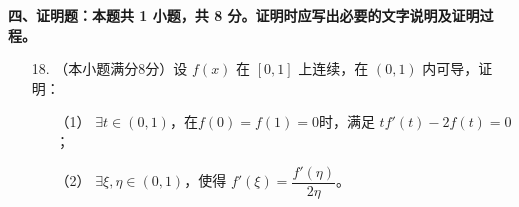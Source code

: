 \documentclass[a4paper,12pt]{article}
\begin{document}
\noindent
\textbf{四、证明题：本题共 1 小题，共 8 分。证明时应写出必要的文字说明及证明过程。}

\begin{enumerate}
    \item[18.]（本小题满分8分）设 \( f(x) \) 在 \( [0, 1] \) 上连续，在 \( (0, 1) \) 内可导，证明：

    \begin{enumerate}
        \item[（1）]\(\exists t \in (0, 1) \)，在\( f(0) = f(1) = 0\)时，满足 \( tf'(t)-2f(t) = 0 \)；
        \item[（2）]\(\exists \xi, \eta \in (0, 1) \)，使得 \( f'(\xi) = \dfrac{f'(\eta)}{2\eta}  \)。
    \end{enumerate}
\end{enumerate}
\end{document}
